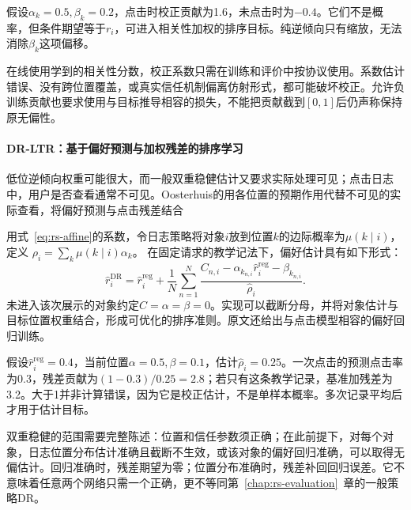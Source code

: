 假设$\alpha_k=0.5,\beta_k=0.2$，点击时校正贡献为1.6，未点击时为$-0.4$。它们不是概率，但条件期望等于$r_i$，可进入相关性加权的排序目标。纯逆倾向只有缩放，无法消除$\beta_k$这项偏移。

在线使用学到的相关性分数，校正系数只需在训练和评价中按协议使用。系数估计错误、没有跨位置覆盖，或真实信任机制偏离仿射形式，都可能破坏校正。允许负训练贡献也要求使用与目标推导相容的损失，不能把贡献截到$[0,1]$后仍声称保持原无偏性。

\paragraph{DR-LTR：基于偏好预测与加权残差的排序学习}
\label{sec:rs-dr-ltr}

低位逆倾向权重可能很大，而一般双重稳健估计又要求实际处理可见；点击日志中，用户是否查看通常不可见。Oosterhuis的用各位置的预期作用代替不可见的实际查看，将偏好预测与点击残差结合

用式~\eqref{eq:rs-affine}的系数，令日志策略将对象$i$放到位置$k$的边际概率为$\mu(k\mid i)$，定义
$\rho_i=\sum_k\mu(k\mid i)\alpha_k$。
在固定请求的教学记法下，偏好估计具有如下形式：
\begin{equation}
 \widehat r_i^{\mathrm{DR}}
 =\widehat r_i^{\mathrm{reg}}
  +\frac1N\sum_{n=1}^{N}
   \frac{C_{n,i}-\alpha_{k_{n,i}}\widehat r_i^{\mathrm{reg}}
                     -\beta_{k_{n,i}}}
        {\widehat\rho_i}.
 \label{eq:rs-dr-ltr}
\end{equation}
未进入该次展示的对象约定$C=\alpha=\beta=0$。实现可以截断分母，并将对象估计与目标位置权重结合，形成可优化的排序准则。原文还给出与点击模型相容的偏好回归训练。

假设$\widehat r_i^{\mathrm{reg}}=0.4$，当前位置$\alpha=0.5,\beta=0.1$，估计$\widehat\rho_i=0.25$。一次点击的预测点击率为0.3，残差贡献为$(1-0.3)/0.25=2.8$；若只有这条教学记录，基准加残差为3.2。大于1并非计算错误，因为它是校正估计，不是单样本概率。多次记录平均后才用于估计目标。

双重稳健的范围需要完整陈述：位置和信任参数须正确；在此前提下，对每个对象，日志位置分布估计准确且截断不生效，或该对象的偏好回归准确，可以取得无偏估计。回归准确时，残差期望为零；位置分布准确时，残差补回回归误差。它不意味着任意两个网络只需一个正确，更不等同第~\ref{chap:rs-evaluation}~章的一般策略DR。


